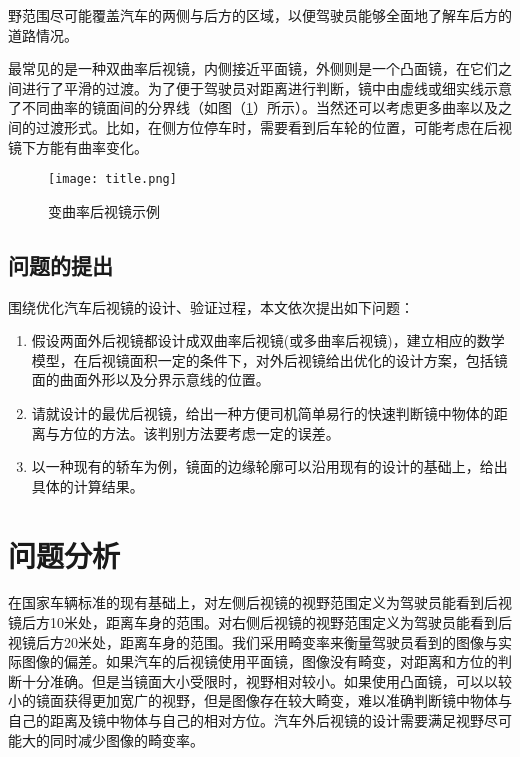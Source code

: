\documentclass[withoutpreface,bwprint]{cumcmthesis} %
\begin{document}
\par 野范围尽可能覆盖汽车的两侧与后方的区域，以便驾驶员能够全面地了解车后方的道路情况。

\par 最常见的是一种双曲率后视镜，内侧接近平面镜，外侧则是一个凸面镜，在它们之间进行了平滑的过渡。为了便于驾驶员对距离进行判断，镜中由虚线或细实线示意了不同曲率的镜面间的分界线（如图（\ref{title}）所示）。当然还可以考虑更多曲率以及之间的过渡形式。比如，在侧方位停车时，需要看到后车轮的位置，可能考虑在后视镜下方能有曲率变化。

\begin{figure}[!htb]
\centering
\texttt{[image: title.png]}
\caption{变曲率后视镜示例}
\label{title}
\end{figure}

\subsection{问题的提出}

围绕优化汽车后视镜的设计、验证过程，本文依次提出如下问题：

\begin{enumerate}
  \item 假设两面外后视镜都设计成双曲率后视镜(或多曲率后视镜)，建立相应的数学模型，在后视镜面积一定的条件下，对外后视镜给出优化的设计方案，包括镜面的曲面外形以及分界示意线的位置。
  \item 请就设计的最优后视镜，给出一种方便司机简单易行的快速判断镜中物体的距离与方位的方法。该判别方法要考虑一定的误差。
  \item 以一种现有的轿车为例，镜面的边缘轮廓可以沿用现有的设计的基础上，给出具体的计算结果。 
\end{enumerate}

\section{问题分析}

\par 在国家车辆标准的现有基础上，对左侧后视镜的视野范围定义为驾驶员能看到后视镜后方10米处，距离车身的范围。对右侧后视镜的视野范围定义为驾驶员能看到后视镜后方20米处，距离车身的范围。我们采用畸变率来衡量驾驶员看到的图像与实际图像的偏差。如果汽车的后视镜使用平面镜，图像没有畸变，对距离和方位的判断十分准确。但是当镜面大小受限时，视野相对较小。如果使用凸面镜，可以以较小的镜面获得更加宽广的视野，但是图像存在较大畸变，难以准确判断镜中物体与自己的距离及镜中物体与自己的相对方位。汽车外后视镜的设计需要满足视野尽可能大的同时减少图像的畸变率。
\end{document}
